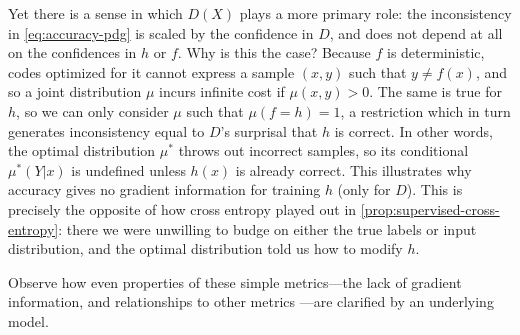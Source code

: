 \documentclass[twoside]{article}
\theoremstyle{plain}
\theoremstyle{definition}
\begin{document}
Yet there is a sense in which 
$D(X)$ plays a more primary role: the inconsistency in \eqref{eq:accuracy-pdg} is scaled by the confidence in $D$, and does not depend at all on the confidences in $h$ or $f$.
%
Why is this the case? Because $f$ is deterministic, codes optimized for it cannot express a sample $(x,y)$ such that $y \ne f(x)$, and so a joint distribution $\mu$ incurs infinite cost if $\mu(x,y) > 0$.
The same is true for $h$, so
we can only consider $\mu$
such that $\mu(f \!=\! h) \!=\! 1$, a restriction which
in turn generates inconsistency equal to $D$'s surprisal that $h$ is correct.
In other words, the optimal distribution $\mu^*$ throws out incorrect samples, so its conditional $\mu^*(Y|x)$ is undefined unless $h(x)$ is already correct.
This illustrates why accuracy gives no gradient information for training $h$ (only for $D$).
This is precisely
the opposite of how cross entropy played out in \cref{prop:supervised-cross-entropy}:
 there we were unwilling to budge on either the true labels or input distribution, and the optimal distribution told us how to modify $h$.
%

Observe how even properties of these simple metrics---the lack of gradient information, and relationships to
 	other metrics%
	---are clarified by an underlying model.
\end{document}
